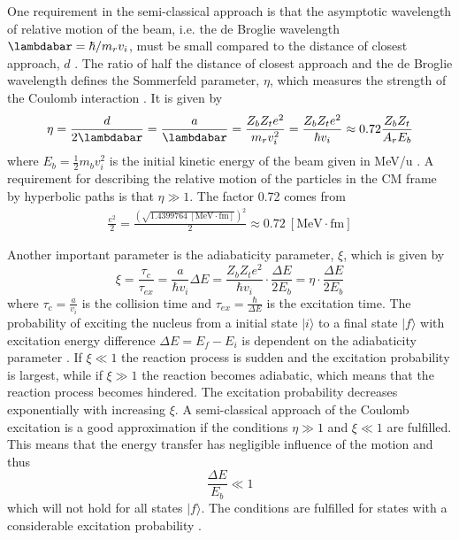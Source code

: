 \documentclass[twoside,english]{uiofysmaster/uiofysmaster}
\begin{document}
One requirement in the semi-classical approach is that the asymptotic wavelength of relative motion of the beam, i.e. the de Broglie wavelength ${\lambdabar = \hbar/m_r v_i}$, must be small compared to the distance of closest approach, $d$ \cite{RBass, EE-Coulex}.
The ratio of half the distance of closest approach and the de Broglie wavelength defines the Sommerfeld parameter, $\eta$, which measures the strength of the Coulomb interaction \cite{Cline1969}.
It is given by
\begin{equation}
	\eta = \frac{d}{2\lambdabar} = \frac{a}{\lambdabar} = \frac{Z_b Z_t e^2}{m_r v_i^2} = \frac{Z_b Z_t e^2}{\hbar v_i} \approx 0.72 \frac{Z_b Z_t}{A_r E_b}
\end{equation}
where $E_b = \tfrac{1}{2} m_b v_i^2$ is the initial kinetic energy of the beam given in MeV/u \cite{RBass}.
A requirement for describing the relative motion of the particles in the CM frame by hyperbolic paths is that $\eta \gg 1$.
The factor 0.72 comes from 
\begin{align}
	\frac{e^2}{2} = \frac{(\sqrt{1.4399764 ~[\text{MeV} \cdot \text{fm}]})^2}{2} \approx 0.72 ~[\text{MeV} \cdot \text{fm}]
\end{align}

Another important parameter is the adiabaticity parameter, $\xi$, which is given by 
\begin{equation}
	\xi = \frac{\tau_c}{\tau_{ex}} = \frac{a}{\hbar v_i}  \Delta E = \frac{Z_b Z_t e^2}{\hbar v_i} \cdot \frac{\Delta E}{2E_b} = \eta \cdot \frac{\Delta E}{2E_b}
\end{equation}
where $\tau_c = \frac{a}{v_i}$ is the collision time and $\tau_{ex} = \frac{\hbar}{\Delta E}$ is the excitation time.
The probability of exciting the nucleus from a initial state $|i\rangle$ to a final state $|f\rangle$ with excitation energy difference $\Delta E = E_f - E_i$ is dependent on the adiabaticity parameter \cite{Niedermaier, NaR, RBass}.
If $\xi \ll 1$ the reaction process is sudden and the excitation probability is largest, while if $\xi \gg 1$ the reaction becomes adiabatic, which means that the reaction process becomes hindered. 
The excitation probability decreases exponentially with increasing $\xi$. 
A semi-classical approach of the Coulomb excitation is a good approximation if the conditions $\eta \gg 1$ and $\xi \ll 1$ are fulfilled.
This means that the energy transfer has negligible influence of the motion and thus  
\begin{equation}
	\frac{\Delta E}{E_b} \ll 1
\end{equation}
which will not hold for all states $|f\rangle$.
The conditions are fulfilled for states with a considerable excitation probability \cite{EE-Coulex, RBass}.
\end{document}
